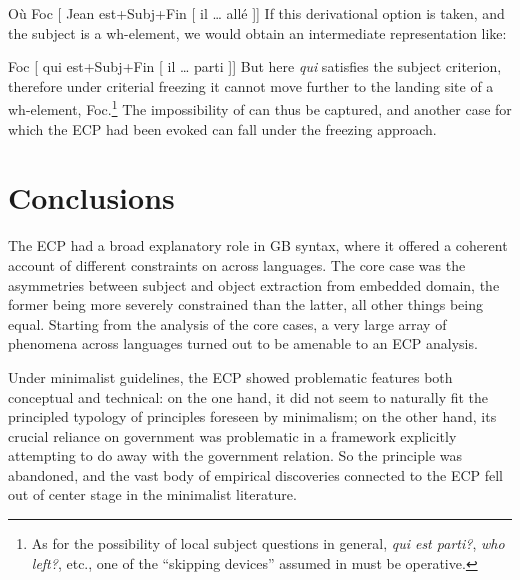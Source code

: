 \documentclass[output=paper]{langsci/langscibook}
\begin{document}
\begin{exe}
\ea%
    \label{ex:key:21.20}
    Où Foc  [ Jean est+Subj+Fin [ il \dots{} allé ]]
\z
%
If this derivational option is taken, and the subject is a wh-element, we would
obtain an intermediate representation like:

\ea%
    \label{ex:key:21.21}
    Foc  [ qui est+Subj+Fin [ il \dots{} parti ]]
\z
%
But here \emph{qui} satisfies the subject criterion, therefore under criterial
freezing it cannot move further to the landing site of a wh-element,
Foc.\footnote{As for the possibility of local subject questions in general,
    \emph{qui est parti?}, \emph{who left?}, etc., one of the “skipping
devices” assumed in \textcite{RizziShlonsky2007} must be operative.} The
impossibility of  can thus be captured, and another case for
which the \gls{ECP} had been evoked can fall under the freezing approach.

\section{Conclusions}

The \gls{ECP} had a broad explanatory role in \gls{GB} syntax, where it offered
a coherent account of different constraints on  across languages. The
core case was the asymmetries between subject and object extraction from
embedded domain, the former being more severely constrained than the latter,
all other things being equal. Starting from the analysis of the core cases, a
very large array of phenomena across languages turned out to be amenable to an
\gls{ECP} analysis.

Under minimalist guidelines, the \gls{ECP} showed problematic features both
conceptual and technical: on the one hand, it did not seem to naturally fit the
principled typology of principles foreseen by minimalism; on the other hand,
its crucial reliance on government was problematic in a framework explicitly
attempting to do away with the government relation. So the principle was
abandoned, and the vast body of empirical discoveries connected to the
\gls{ECP} fell out of center stage in the minimalist literature.


\end{exe}
\end{document}
